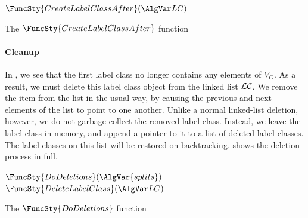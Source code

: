 \begin{algorithm}[htb]
\AlgorithmFontSize
\DontPrintSemicolon
\nl $\FuncSty{CreateLabelClassAfter}(\LC)$ \;
\nl {}
\caption{The $\FuncSty{CreateLabelClassAfter}$ function}
\label{McSplitSIAlgCreateLC}
\end{algorithm}

\paragraph{Cleanup}
In , we see that the first label class
no longer contains any elements of $V_G$.  As a result, we must delete this label
class object from the linked list $\mathcal{LC}$.
We remove the item from the list in the usual way,
by causing the previous and next elements of the list to point to one
another.
Unlike a normal linked-list deletion, however,
we do not garbage-collect the removed label class.  Instead,
we leave the label class in memory, and append a pointer
to it to a list of deleted label classes.  The label
classes on this list will be restored on backtracking.
 shows the deletion process in full.

\begin{algorithm}[htb]
\AlgorithmFontSize
\DontPrintSemicolon
\nl $\FuncSty{DoDeletions}(\AlgVar{splits})$ \;
\nl {}
\;
\nl $\FuncSty{DeleteLabelClass}(\LC)$ \;
\nl {}
\caption{The $\FuncSty{DoDeletions}$ function}
\label{McSplitSIAlgDelete}
\end{algorithm}

